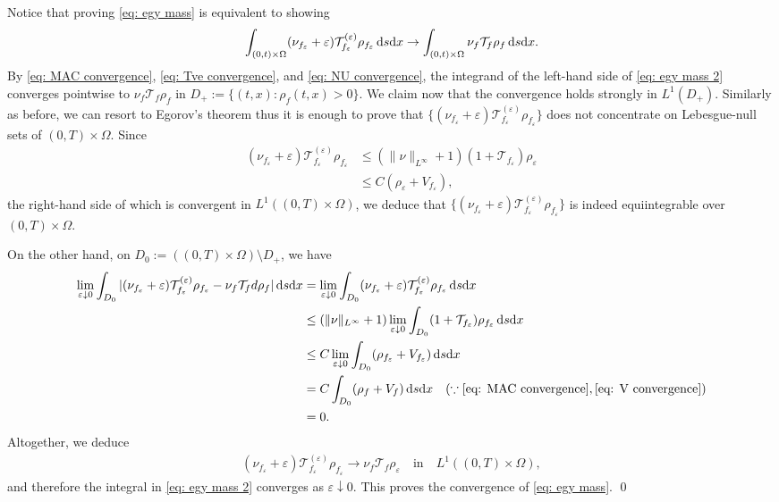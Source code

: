 \documentclass[10pt, reqno]{amsart}
\theoremstyle{plain}
\theoremstyle{definition}
\theoremstyle{remark}
\renewenvironment{proof}[1][\proofname]{\noindent{\scshape #1.\quad}}{\qed}
\numberwithin{equation}{section}
\newcommand{\calT}{\mathcal T}
\newcommand{\ve}{\varepsilon}
\newcommand{\dx}{\textnormal{d}x}
\newcommand{\ds}{\textnormal{d}s}
\begin{document}
\begin{proof}
Notice that proving \eqref{eq: egy mass} is equivalent to showing
\begin{align}\label{eq: egy mass 2}
    \int_{(0,t)\times\Omega} (\nu_{f_\ve}+\ve) \calT_{f_\ve}^{(\ve)}\rho_{f_\ve} \,\ds\dx \to \int_{(0,t)\times\Omega} \nu_f \calT_f \rho_f \,\ds\dx.
\end{align}
By \eqref{eq: MAC convergence}, \eqref{eq: Tve convergence}, and \eqref{eq: NU convergence}, the integrand of the left-hand side of \eqref{eq: egy mass 2} converges pointwise to $\nu_f \calT_f  \rho_f$ in $D_+:= \{(t,x): \rho_f(t,x)>0\}$. We claim now that the convergence holds strongly in $L^1(D_+)$. Similarly as before, we can resort to Egorov's theorem thus it is enough to prove that $\{(\nu_{f_\ve}+\ve)\calT_{f_\ve}^{(\ve)} \rho_{f_\ve}\}$ does not concentrate on Lebesgue-null sets of $(0,T)\times \Omega$. Since
\begin{align*}
    (\nu_{f_\ve} + \ve) \calT_{f_\ve}^{(\ve)} \rho_{f_\ve} &\le  (\|\nu\|_{L^\infty} + 1) (1 + \calT_{f_\ve}) \rho_\ve \\
    &\le C (\rho_\ve + V_{f_\ve}),
\end{align*}
the right-hand side of which is convergent in $L^1((0,T)\times\Omega)$, we deduce that $\{(\nu_{f_\ve}+\ve)\calT_{f_\ve}^{(\ve)} \rho_{f_\ve}\}$ is indeed equiintegrable over $(0,T)\times \Omega$.

On the other hand, on $D_0:= ((0,T)\times\Omega)\setminus D_+$, we have
\begin{align*}
    \lim_{\ve\downarrow 0} \int_{D_0} |(\nu_{f_\ve} + \ve) \calT_{f_\ve}^{(\ve)}\rho_{f_\ve} - \nu_f \calT_f d \rho_f | \,\ds\dx &= \lim_{\ve\downarrow 0} \int_{D_0} (\nu_{f_\ve} + \ve) \calT_{f_\ve}^{(\ve)} \rho_{f_\ve} \,\ds\dx \\
    &\le (\|\nu\|_{L^\infty} + 1) \lim_{\ve\downarrow 0} \int_{D_0} (1 + \calT_{f_\ve}) \rho_{f_\ve}  \,\ds\dx \\
    &\le C \lim_{\ve\downarrow 0} \int_{D_0} (\rho_{f_\ve} + V_{f_\ve}) \,\ds\dx \\
    &= C \int_{D_0} (\rho_f + V_f) \,\ds\dx \quad (\because \eqref{eq: MAC convergence}, \eqref{eq: V convergence}) \\
    &= 0.
\end{align*}
Altogether, we deduce
\begin{align*}
    (\nu_{f_\ve} + \ve) \calT_{f_\ve}^{(\ve)} \rho_{f_\ve} \to \nu_f \calT_f \rho_\ve \quad \text{in} \quad L^1((0,T)\times\Omega),
\end{align*}
and therefore the integral in \eqref{eq: egy mass 2} converges as $\ve\downarrow 0$. This proves the convergence of \eqref{eq: egy mass}.
\end{proof}
\end{document}
